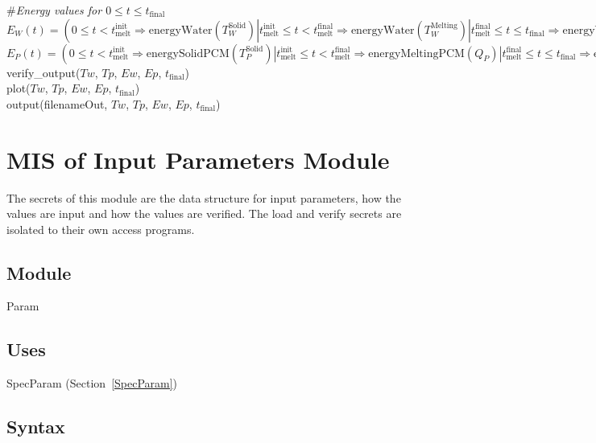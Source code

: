 \documentclass[12pt, titlepage]{article}
\begin{document}
\noindent \#\textit{Energy values for $0 \leq t \leq t_\text{final}$}\\

\noindent $E_W(t) = (0 \leq t < t_\text{melt}^{\text{init}} \Rightarrow
\text{energyWater}(T_W^{\text{Solid}}) | t_\text{melt}^{\text{init}} \leq t <
t_\text{melt}^{\text{final}} \Rightarrow \text{energyWater}(T_W^{\text{Melting}}) | t_\text{melt}^{\text{final}} \leq t \leq
t_\text{final} \Rightarrow \text{energyWater}(T_W^{\text{Liquid}}) )$\\

\noindent $E_P(t) = (0 \leq t < t_\text{melt}^{\text{init}} \Rightarrow
\text{energySolidPCM}(T_P^{\text{Solid}}) | t_\text{melt}^{\text{init}} \leq t <
t_\text{melt}^{\text{final}} \Rightarrow \text{energyMeltingPCM}(Q_P) | t_\text{melt}^{\text{final}} \leq t \leq
t_\text{final} \Rightarrow \text{energyLiquidPCM}(T_P^{\text{Liquid}}) )$\\

\noindent verify\_output($Tw$, $Tp$, $Ew$, $Ep$, $t_\text{final}$)\\

\noindent plot($Tw$, $Tp$, $Ew$, $Ep$, $t_\text{final}$)\\

\noindent output(filenameOut, $Tw$, $Tp$, $Ew$, $Ep$, $t_\text{final}$)\\

\newpage

\section{MIS of Input Parameters Module} \label{Parameters}

The secrets of this module are the data structure for input parameters, how the
values are input and how the values are verified.  The load and verify secrets
are isolated to their own access programs.

\subsection{Module}

Param

\subsection{Uses}

SpecParam (Section~\ref{SpecParam})

\subsection{Syntax}
\end{document}
